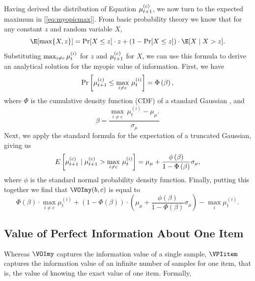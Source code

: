 Having derived the distribution of Equation $\mu_{t+1}^{(c)}$, we now turn to the expected maximum in [\ref{eq:myopicmax}]. From basic probability theory we know that for any constant $z$ and random variable $X$,
%
\begin{equation}
  \label{eq:emaxtrick}
  \E[\max\{X,z\}] = 
    \Pr[X\le z]\cdot z+
    (1-\Pr[X\le z]) 
    \cdot \E[X\mid X>z].
\end{equation}
%
%
Substituting $\max_{i \neq c} \mu_t^{(i)}$ for $z$ and $\mu_{t+1}^{(c)}$ for $X$, we can use this formula to derive an analytical solution for the myopic value of information. First, we have
%
\begin{equation*}
  \Pr\left[\mu_{t+1}^{(c)}\le \max_{i\neq c}\,\mu_t^{(i)}\right]=\Phi\left(\beta\right),
\end{equation*}
%
where $\Phi$ is the cumulative density function (CDF) of a standard Gaussian , and 
%
\begin{equation*}
  \beta=\frac{\max_{i\neq c}\,\mu_t^{(i)}-\mu_{\mu}.}{\sigma_{\mu}}
\end{equation*}
%
Next, we apply the standard formula for the expectation of a truncated Gaussian, giving us
%
\begin{equation*}
  E\left[\mu_{t+1}^{(c)}\mid\mu_{t+1}^{(c)}>\max_{i\neq c}\,\mu_t^{(i)}\right]=\mu_{\mu}+\frac{\phi\left(\beta\right)}{1-\Phi\left(\beta\right)}\sigma_{\mu},
\end{equation*}
%
where $\phi$ is the standard normal probability density function.
Finally, putting this together we find that $\VOImy(b,c)$ is equal to
%
\begin{equation*}
  \Phi(\beta)\cdot\max_{i\neq c}\mu_t^{(i)}+\left(1-\Phi(\beta)\right)\cdot\left(\mu_{\mu}+\frac{\phi\left(\beta\right)}{1-\Phi\left(\beta\right)}\sigma_{\mu}\right)-\max_{i}\mu_t^{(i)}.
\end{equation*}


\subsection{Value of Perfect Information About One Item}
Whereas $\VOImy$ captures the information value of a single sample, $\VPIitem$ captures the information value of an infinite number of samples for one item, that is, the value of knowing the exact value of one item. Formally,

